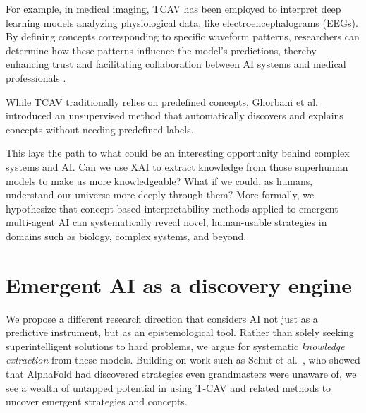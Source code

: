 \documentclass[11pt]{article}
\begin{document}
For example, in medical imaging, TCAV has been employed to interpret deep learning models analyzing physiological data, like electroencephalograms (EEGs). By defining concepts corresponding to specific waveform patterns, researchers can determine how these patterns influence the model's predictions, thereby enhancing trust and facilitating collaboration between AI systems and medical professionals \cite{tcav_eeg}.

While TCAV traditionally relies on predefined concepts, Ghorbani et al. \cite{ghorbani2019} introduced an unsupervised method that automatically discovers and explains concepts without needing predefined labels.

This lays the path to what could be an interesting opportunity behind complex systems and AI. Can we use XAI to extract knowledge from those superhuman models to make us more knowledgeable? What if we could, as humans, understand our universe more deeply through them?
More formally, we hypothesize that concept-based interpretability methods applied to emergent multi-agent AI can systematically reveal novel, human-usable strategies in domains such as biology, complex systems, and beyond.

\section{Emergent AI as a discovery engine}
We propose a different research direction that considers AI not just as a predictive instrument, but as an epistemological tool. Rather than solely seeking superintelligent solutions to hard problems, we argue for systematic \emph{knowledge extraction} from these models. Building on work such as Schut et al.~\cite{schut}, who showed that AlphaFold had discovered strategies even grandmasters were unaware of, we see a wealth of untapped potential in using T-CAV and related methods to uncover emergent strategies and concepts.
\end{document}
